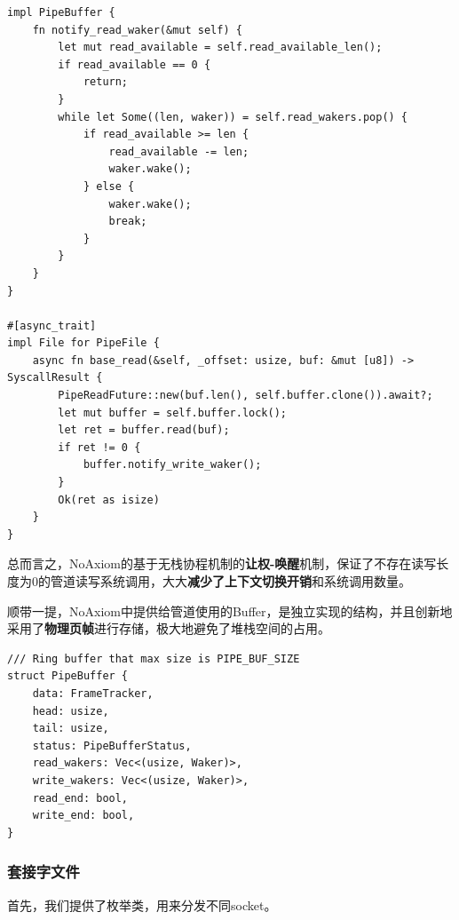 \documentclass{article}
\begin{document}
\begin{lstlisting}
impl PipeBuffer {
    fn notify_read_waker(&mut self) {
        let mut read_available = self.read_available_len();
        if read_available == 0 {
            return;
        }
        while let Some((len, waker)) = self.read_wakers.pop() {
            if read_available >= len {
                read_available -= len;
                waker.wake();
            } else {
                waker.wake();
                break;
            }
        }
    }
}

#[async_trait]
impl File for PipeFile {
    async fn base_read(&self, _offset: usize, buf: &mut [u8]) -> SyscallResult {
        PipeReadFuture::new(buf.len(), self.buffer.clone()).await?;
        let mut buffer = self.buffer.lock();
        let ret = buffer.read(buf);
        if ret != 0 {
            buffer.notify_write_waker();
        }
        Ok(ret as isize)
    }
}
\end{lstlisting}

总而言之，NoAxiom的基于无栈协程机制的\textbf{让权-唤醒}机制，保证了不存在读写长度为0的管道读写系统调用，大大\textbf{减少了上下文切换开销}和系统调用数量。

顺带一提，NoAxiom中提供给管道使用的Buffer，是独立实现的结构，并且创新地采用了\textbf{物理页帧}进行存储，极大地避免了堆栈空间的占用。

\begin{lstlisting}
/// Ring buffer that max size is PIPE_BUF_SIZE
struct PipeBuffer {
    data: FrameTracker,
    head: usize,
    tail: usize,
    status: PipeBufferStatus,
    read_wakers: Vec<(usize, Waker)>,
    write_wakers: Vec<(usize, Waker)>,
    read_end: bool,
    write_end: bool,
}
\end{lstlisting}

\subsubsection{套接字文件}
首先，我们提供了枚举类，用来分发不同socket。
\end{document}
